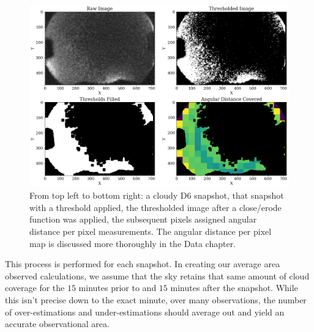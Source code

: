 \begin{figure}[ht!]
  \centering
  \includegraphics[scale=0.4]{images/Cloud_analysis.png}
  \caption{From top left to bottom right: a cloudy D6 snapshot, that snapshot with a threshold applied, the thresholded image after a close/erode function was applied, the subsequent pixels assigned angular distance per pixel measurements.  The angular distance per pixel map is discussed more thoroughly in the Data chapter.}
  \label{colorclouds}
\end{figure}

This process is performed for each snapshot.
In creating our average area observed calculations, we assume that the sky retains that same amount of cloud coverage for the $15$ minutes prior to and $15$ minutes after the snapshot.
While this isn't precise down to the exact minute, over many observations, the number of over-estimations and under-estimations should average out and yield an accurate observational area.























 
